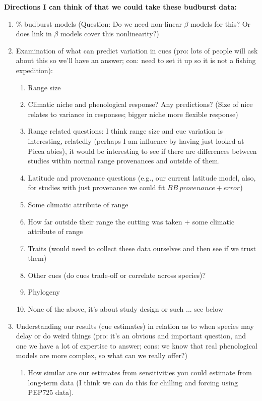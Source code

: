 \documentclass[11pt,letterpaper]{article}
\begin{document}
{\bf Directions I can think of that we could take these budburst data:}
\begin{enumerate}
\item \% budburst models (Question: Do we need non-linear $\beta$ models for this? Or does link in $\beta$ models cover this nonlinearity?)
\item Examination of what can predict variation in cues (pro: lots of people will ask about this so we'll have an answer; con: need to set it up so it is not a fishing expedition):
\begin{enumerate}
\item Range size
\item Climatic niche and phenological response? Any predictions? (Size of nice relates to variance in responses; bigger niche more flexible response)
\item Range related questions: I think range size and cue variation is interesting, relatedly (perhaps I am influence by having just looked at Picea abies), it would be interesting to see if there are differences between studies within normal range provenances and outside of them.
\item Latitude and provenance questions (e.g., our current latitude model, also, for studies with just provenance we could fit $BB~provenance+error$)
\item Some climatic attribute of range
\item How far outside their range the cutting was taken + some climatic attribute of range
\item Traits (would need to collect these data ourselves and then see if we trust them)
\item Other cues (do cues trade-off or correlate across species)?
\item Phylogeny
\item None of the above, it's about study design or such ... see below %
\end{enumerate}
\item Understanding our results (cue estimates) in relation as to when species may delay or do weird things (pro: it's an obvious and important question, and one we have a lot of expertise to answer; cons: we know that real phenological models are more complex, so what can we really offer?) 
\begin{enumerate}
\item How similar are our estimates from sensitivities you could estimate from long-term data (I think we can do this for chilling and forcing using PEP725 data).

\end{enumerate}
\end{enumerate}
\end{document}
